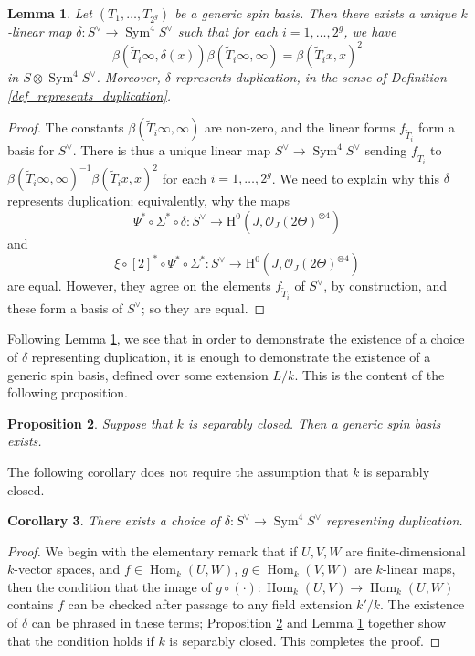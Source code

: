 \documentclass{article} %
\newtheorem{proposition}{Proposition}[section]
\newtheorem{lemma}[proposition]{Lemma}
\newtheorem{corollary}[proposition]{Corollary}
\numberwithin{equation}{section}
\DeclareMathOperator{\Hom}{Hom}
\DeclareMathOperator{\Sym}{Sym}
\renewcommand{\O}{\mathcal{O}}
\newcommand{\HH}{\mathrm{H}}
\begin{document}
\begin{lemma}\label{lem_from_spin_basis_to_duplication_polynomial}
    Let $(T_1, \dots, T_{2^g})$ be a generic spin basis. Then there exists a unique $k$-linear map $\delta : S^\vee \to \Sym^4 S^\vee$ such that for each $i = 1, \dots, 2^g$, we have
    \[ \beta( \widetilde{T}_i \infty,\delta(x)) \beta(\widetilde{T}_i \infty,\infty) = \beta( \widetilde{T}_i x,x)^2\]
    in $S\otimes \Sym^4 S^{\vee}$.
    Moreover, $\delta$ represents duplication, in the sense of Definition \ref{def_represents_duplication}.
\end{lemma}
\begin{proof}
    The constants $\beta( \widetilde{T}_i \infty, \infty)$ are non-zero, and the linear forms $f_{\widetilde{T}_i}$ form a basis for $S^\vee$. There is thus a unique linear map $S^\vee \to \Sym^4 S^\vee$ sending $f_{\widetilde{T}_i}$ to $\beta( \widetilde{T}_i \infty,\infty)^{-1} \beta(\widetilde{T}_i x,x)^2$ for each $i = 1, \dots, 2^g$. We need to explain why this $\delta$ represents duplication; equivalently, why the maps
    \[ \Psi^\ast \circ\Sigma^\ast  \circ \delta : S^\vee \to\HH^0(J, \O_J(2 \Theta)^{\otimes 4}) \]
    and 
    \[ \xi \circ [2]^\ast\circ \Psi^\ast \circ \Sigma^\ast: S^\vee \to\HH^0(J, \O_J(2 \Theta)^{\otimes 4}) \]
    are equal. However, they agree on the elements $f_{\widetilde{T}_i}$ of $S^\vee$, by construction, and these form a basis of $S^\vee$; so they are equal. 
\end{proof}
Following Lemma \ref{lem_from_spin_basis_to_duplication_polynomial}, we see that in order to demonstrate the existence of a choice of $\delta$ representing duplication, it is enough to demonstrate the existence of a generic spin basis, defined over some extension $L / k$. This is the content of the following proposition. 
\begin{proposition}\label{prop_existence_of_independent_torsion_points}
    Suppose that $k$ is separably closed. Then a generic spin basis exists. 
\end{proposition}
    The following corollary does not require the assumption that $k$ is separably closed.
\begin{corollary}\label{cor_existence_of_duplication}
    There exists a choice of $\delta : S^\vee \to \Sym^4 S^\vee$ representing duplication. 
\end{corollary}
\begin{proof}
    We begin with the elementary remark that if $U, V, W$ are finite-dimensional $k$-vector spaces, and $f \in \Hom_k(U, W)$, $g \in \Hom_k(V, W)$ are $k$-linear maps, then the condition that the image of $g \circ (\cdot) : \Hom_k(U, V) \to \Hom_k(U, W)$ contains $f$ can be checked after passage to any field extension $k' / k$. The existence of $\delta$ can be phrased in these terms; Proposition \ref{prop_existence_of_independent_torsion_points} and Lemma \ref{lem_from_spin_basis_to_duplication_polynomial} together show that the condition holds if $k$ is separably closed. This completes the proof. 
\end{proof}
\end{document}
